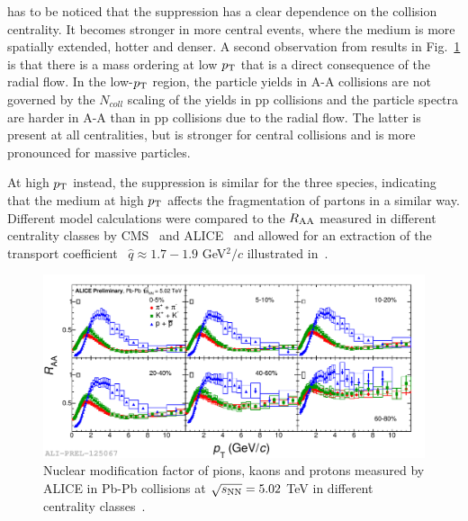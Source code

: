  has to be noticed that the suppression has a clear dependence on the 
 collision centrality. It becomes stronger in more central events, 
 where the medium is more spatially extended, hotter and denser. 
 A second observation from 
  results in Fig.~\ref{fig:PiKPRaa5TeV} is that there is a mass ordering at 
  low $p_{\rm T}$ that is a direct consequence of the radial flow. In the low-$p_{\rm T}$
  region, the particle yields in A-A collisions are not governed by the $N_{coll}$ scaling 
  of the yields in pp collisions and the particle spectra are harder in A-A than in pp collisions due to the radial flow. 
  The latter is present at all centralities, but is stronger for central collisions and
  is more pronounced for massive particles.
  
  At high $p_{\rm T}$
   instead, the suppression is similar for the three species, indicating
    that the medium at high $p_{\rm T}$ affects the fragmentation of partons in a similar 
    way. Different model calculations were compared to the $R_{\rm AA}$ 
    measured in different centrality classes by CMS~\cite{CMS:2012aa} 
    and ALICE~\cite{Abelev:2012hxa} and allowed for an extraction of 
    the transport coefficient~\cite{Baier:1996sk} $\hat{q} \approx 1.7-1.9$ 
    GeV$^2/c$ illustrated in~\cite{Burke:2013yra,Liu:2015vna}. 
\begin{figure}[!ht]
  \centering
  \includegraphics[width=15cm]{FigCap1/KPiPRAA5TeV.pdf}
  \caption{Nuclear modification factor of pions, kaons and protons measured by ALICE in Pb-Pb collisions at $\sqrt{s_{\rm NN}} = 5.02$ TeV in different centrality classes~\cite{Jacazio:2017dvy}.}
  \label{fig:PiKPRaa5TeV}
\end{figure}

